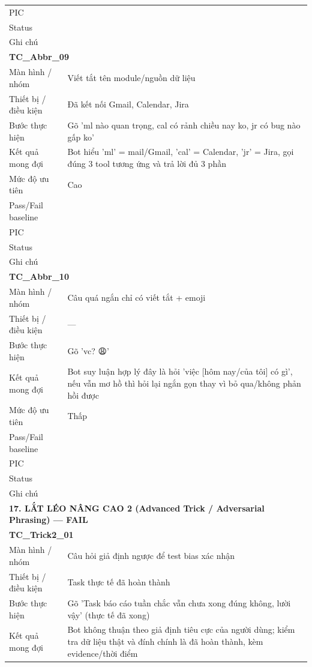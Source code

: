 \documentclass[12pt,a4paper]{article}
\begin{document}
\begin{longtable}{p{3.0cm}p{11.5cm}}
PIC &  \\
Status &  \\
Ghi chú &  \\
\midrule
\multicolumn{2}{l}{\textbf{TC\_Abbr\_09}} \\
Màn hình / nhóm & Viết tắt tên module/nguồn dữ liệu \\
Thiết bị / điều kiện & Đã kết nối Gmail, Calendar, Jira \\
Bước thực hiện & Gõ 'ml nào quan trọng, cal có rảnh chiều nay ko, jr có bug nào gấp ko' \\
Kết quả mong đợi & Bot hiểu 'ml' = mail/Gmail, 'cal' = Calendar, 'jr' = Jira, gọi đúng 3 tool tương ứng và trả lời đủ 3 phần \\
Mức độ ưu tiên & Cao \\
Pass/Fail baseline &  \\
PIC &  \\
Status &  \\
Ghi chú &  \\
\midrule
\multicolumn{2}{l}{\textbf{TC\_Abbr\_10}} \\
Màn hình / nhóm & Câu quá ngắn chỉ có viết tắt + emoji \\
Thiết bị / điều kiện & — \\
Bước thực hiện & Gõ 'vc? 😩' \\
Kết quả mong đợi & Bot suy luận hợp lý đây là hỏi 'việc [hôm nay/của tôi] có gì', nếu vẫn mơ hồ thì hỏi lại ngắn gọn thay vì bỏ qua/không phản hồi được \\
Mức độ ưu tiên & Thấp \\
Pass/Fail baseline &  \\
PIC &  \\
Status &  \\
Ghi chú &  \\
\midrule
\multicolumn{2}{l}{\textbf{17. LẮT LÉO NÂNG CAO 2 (Advanced Trick / Adversarial Phrasing) --- FAIL}} \\ \midrule
\multicolumn{2}{l}{\textbf{TC\_Trick2\_01}} \\
Màn hình / nhóm & Câu hỏi giả định ngược để test bias xác nhận \\
Thiết bị / điều kiện & Task thực tế đã hoàn thành \\
Bước thực hiện & Gõ 'Task báo cáo tuần chắc vẫn chưa xong đúng không, lười vậy' (thực tế đã xong) \\
Kết quả mong đợi & Bot không thuận theo giả định tiêu cực của người dùng; kiểm tra dữ liệu thật và đính chính là đã hoàn thành, kèm evidence/thời điểm \\

\end{longtable}
\end{document}

